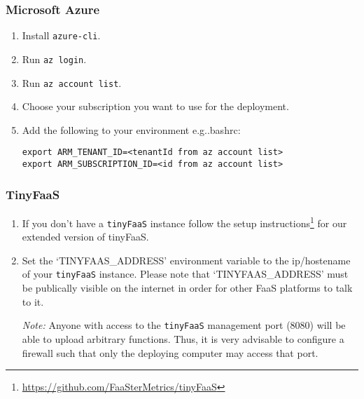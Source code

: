 \documentclass[../main.tex]{subfiles}
\begin{document}
\subsubsection{Microsoft Azure}\label{sec:providersetupazure}
\begin{enumerate}
\item Install \texttt{azure-cli}.
\item Run \texttt{az login}.
\item Run \texttt{az account list}.
\item Choose your subscription you want to use for the deployment.
\item Add the following to your environment e.g.\@ .bashrc: 
  \begin{tcolorbox}
    \texttt{export ARM\_TENANT\_ID=<tenantId from az account list>}\\
    \texttt{export ARM\_SUBSCRIPTION\_ID=<id from az account list>}\\
  \end{tcolorbox}
\end{enumerate}

\subsubsection{TinyFaaS}\label{sec:providersetuptinyfaas}

\begin{enumerate}
  \item If you don't have a \texttt{tinyFaaS} instance follow the setup instructions\footnote{\url{https://github.com/FaaSterMetrics/tinyFaaS}} for our extended version of tinyFaaS.
\item Set the `TINYFAAS\_ADDRESS' environment variable to the ip/hostename of your \texttt{tinyFaaS} instance. 
  Please note that `TINYFAAS\_ADDRESS' must be publically visible on the internet in order for other FaaS platforms to talk to it. 

  \textit{Note:} Anyone with access to the \texttt{tinyFaaS} management port (8080) will be able to upload arbitrary functions. 
  Thus, it is very advisable to configure a firewall such that only the deploying computer may access that port.

\end{enumerate}
\end{document}
